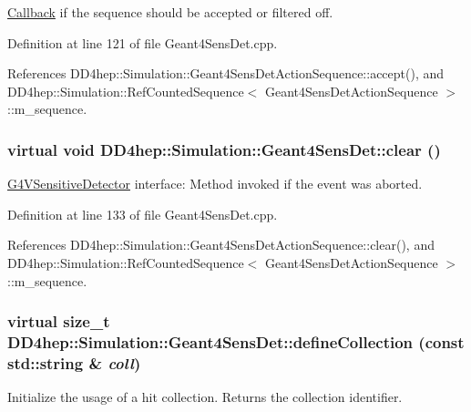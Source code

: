 \hyperlink{class_d_d4hep_1_1_callback}{Callback} if the sequence should be accepted or filtered off. 

Definition at line 121 of file Geant4SensDet.cpp.

References DD4hep::Simulation::Geant4SensDetActionSequence::accept(), and DD4hep::Simulation::RefCountedSequence$<$ Geant4SensDetActionSequence $>$::m\_\-sequence.\hypertarget{class_d_d4hep_1_1_simulation_1_1_geant4_sens_det_a6840565286dac4c3b705d86589010e37}{
\subsubsection[{clear}]{\setlength{\rightskip}{0pt plus 5cm}virtual void DD4hep::Simulation::Geant4SensDet::clear ()}}
\label{class_d_d4hep_1_1_simulation_1_1_geant4_sens_det_a6840565286dac4c3b705d86589010e37}


\hyperlink{class_g4_v_sensitive_detector}{G4VSensitiveDetector} interface: Method invoked if the event was aborted. 

Definition at line 133 of file Geant4SensDet.cpp.

References DD4hep::Simulation::Geant4SensDetActionSequence::clear(), and DD4hep::Simulation::RefCountedSequence$<$ Geant4SensDetActionSequence $>$::m\_\-sequence.\hypertarget{class_d_d4hep_1_1_simulation_1_1_geant4_sens_det_af75a2eab653115fffe05ccb32828a461}{
\subsubsection[{defineCollection}]{\setlength{\rightskip}{0pt plus 5cm}virtual size\_\-t DD4hep::Simulation::Geant4SensDet::defineCollection (const std::string \& {\em coll})}}
\label{class_d_d4hep_1_1_simulation_1_1_geant4_sens_det_af75a2eab653115fffe05ccb32828a461}


Initialize the usage of a hit collection. Returns the collection identifier. 

